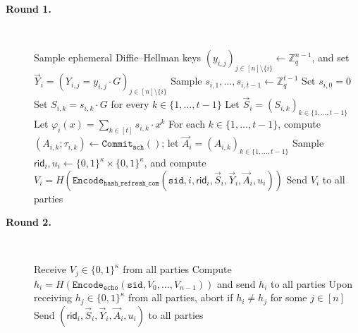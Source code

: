 \documentclass[11pt]{article}
\newcommand{\sid}{\ensuremath{\mathtt{sid}}}
\newcommand{\var}[1]{\ensuremath{\mathtt{#1}}}
\newcommand{\commit}[1]{\ensuremath{\mathtt{Commit}_{\mathtt{#1}}}}
\newcommand{\Encode}[1][]{\ensuremath{\mathtt{Encode}_{\mathtt{#1}}}}
\newcommand{\rid}{\textsf{rid}}
\newcommand{\Z}{\mathbb{Z}}
\newcommand{\?}[1]{\stackrel{?}{#1}}
\newcommand{\Bit}{\ensuremath{\{0{,}1\}}}
\begin{document}
\begin{description}
    \item[\textbf{Round 1.}] \
    \begin{algorithmic}[1]
        \State Sample ephemeral Diffie--Hellman keys $(y_{i,j})_{j \in [n] \setminus \{i\}} \gets \Z_q^{n-1}$,
               and set $\vec Y_i = (Y_{i,j} = y_{i,j} \cdot G)_{j \in [n] \setminus \{i\}}$
        \State Sample $s_{i,1}, \ldots, s_{i,t-1} \gets \Z_q^{t-1}$
        \State Set $s_{i,0} = 0$
        \State Set $S_{i,k} = s_{i,k} \cdot G$ for every $k \in \{1, \ldots, t-1\}$
        \State Let $\vec S_i = (S_{i,k})_{k \in \{1, \ldots, t-1\}}$
        \State Let $\varphi_i(x) = \sum_{k \in [t]} s_{i,k} \cdot x^k$
        \State For each $k \in \{1, \ldots, t-1\}$, compute $(A_{i,k}; \tau_{i,k}) \gets \commit{sch}()$;
               let $\vec A_i = (A_{i,k})_{k \in \{1, \ldots, t-1\}}$
        \State Sample $\rid_i, u_i \gets \Bit^\kappa \times \Bit^\kappa$,
               and compute $V_i = H(\Encode[hash\_refresh\_com](\sid, i, \rid_i, \vec S_i, \vec Y_i, \vec A_i, u_i))$
        \State Send $V_i$ to all parties
    \end{algorithmic}

    \item[\textbf{Round 2.}] \
    \begin{algorithmic}[1]
        \State Receive $V_j \in \Bit^\kappa$ from all parties
        \If{$\var{echo\_enabled}$} 
            \State Compute $h_i = H(\Encode[echo](\sid, V_0, \dots, V_{n-1}))$ and send $h_i$ to all parties
            \State Upon receiving $h_j \in \Bit^\kappa$ from all parties, abort if $h_i \neq h_j$ for some $j \in [n]$
        \EndIf
        \State Send $(\rid_i, \vec S_i, \vec Y_i, \vec A_i, u_i)$ to all parties
    \end{algorithmic}


\end{description}
\end{document}
